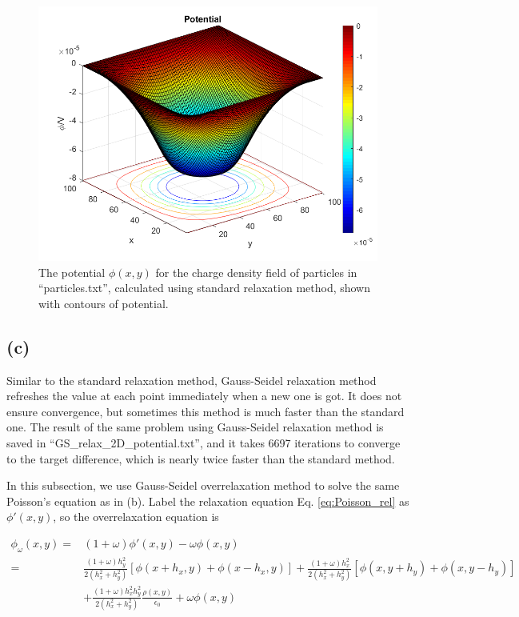 \documentclass[12pt, graphicx]{article}
\begin{document}
\clearpage

\begin{figure}[ht]
\centering
\includegraphics[width = 140mm]{potentialc.png}
\caption{The potential $\phi(x,y)$ for the charge density field of particles in \textquotedblleft particles.txt\textquotedblright, calculated using standard relaxation method, shown with contours of potential.}
\label{fig:pot_relc}
\end{figure}

\subsection*{(c)}
Similar to the standard relaxation method, Gauss-Seidel relaxation method refreshes the value at each point immediately when a new one is got. It does not ensure convergence, but sometimes this method is much faster than the standard one. The result of the same problem using Gauss-Seidel relaxation method is saved in \textquotedblleft GS\_relax\_2D\_potential.txt\textquotedblright, and it takes 6697 iterations to converge to the target difference, which is nearly twice faster than the standard method.\par
In this subsection, we use Gauss-Seidel overrelaxation method to solve the same Poisson's equation as in (b). Label the relaxation equation Eq. \ref{eq:Poisson_rel} as $\phi'(x,y)$, so the overrelaxation equation is 

\begin{equation}
\begin{aligned}
\phi_\omega(x,y)=&(1+\omega)\phi'(x,y)-\omega\phi(x,y)\\
=&\frac{(1+\omega)h_y^2}{2(h_x^2+h_y^2)}[\phi(x+h_x,y)+\phi(x-h_x,y)]+\frac{(1+\omega)h_x^2}{2(h_x^2+h_y^2)}[\phi(x,y+h_y)+\phi(x,y-h_y)]\\
&+\frac{(1+\omega)h_x^2h_y^2}{2(h_x^2+h_y^2)}\frac{\rho(x,y)}{\epsilon_0}+\omega\phi(x,y)
\end{aligned}
\end{equation}
\end{document}
